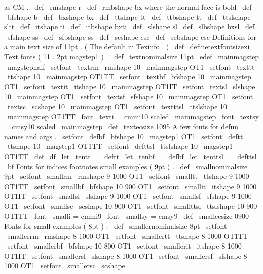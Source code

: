 {{as
CM
.
\
def
\
rmshape
{
r
}
\
def
\
rmbshape
{
bx
}
%
where
the
normal
face
is
bold
\
def
\
bfshape
{
b
}
\
def
\
bxshape
{
bx
}
\
def
\
ttshape
{
tt
}
\
def
\
ttbshape
{
tt
}
\
def
\
ttslshape
{
sltt
}
\
def
\
itshape
{
ti
}
\
def
\
itbshape
{
bxti
}
\
def
\
slshape
{
sl
}
\
def
\
slbshape
{
bxsl
}
\
def
\
sfshape
{
ss
}
\
def
\
sfbshape
{
ss
}
\
def
\
scshape
{
csc
}
\
def
\
scbshape
{
csc
}
%
Definitions
for
a
main
text
size
of
11pt
.
(
The
default
in
Texinfo
.
)
%
\
def
\
definetextfontsizexi
{
%
%
Text
fonts
(
11
.
2pt
magstep1
)
.
\
def
\
textnominalsize
{
11pt
}
\
edef
\
mainmagstep
{
\
magstephalf
}
\
setfont
\
textrm
\
rmshape
{
10
}
{
\
mainmagstep
}
{
OT1
}
\
setfont
\
texttt
\
ttshape
{
10
}
{
\
mainmagstep
}
{
OT1TT
}
\
setfont
\
textbf
\
bfshape
{
10
}
{
\
mainmagstep
}
{
OT1
}
\
setfont
\
textit
\
itshape
{
10
}
{
\
mainmagstep
}
{
OT1IT
}
\
setfont
\
textsl
\
slshape
{
10
}
{
\
mainmagstep
}
{
OT1
}
\
setfont
\
textsf
\
sfshape
{
10
}
{
\
mainmagstep
}
{
OT1
}
\
setfont
\
textsc
\
scshape
{
10
}
{
\
mainmagstep
}
{
OT1
}
\
setfont
\
textttsl
\
ttslshape
{
10
}
{
\
mainmagstep
}
{
OT1TT
}
\
font
\
texti
=
cmmi10
scaled
\
mainmagstep
\
font
\
textsy
=
cmsy10
scaled
\
mainmagstep
\
def
\
textecsize
{
1095
}
%
A
few
fonts
for
defun
names
and
args
.
\
setfont
\
defbf
\
bfshape
{
10
}
{
\
magstep1
}
{
OT1
}
\
setfont
\
deftt
\
ttshape
{
10
}
{
\
magstep1
}
{
OT1TT
}
\
setfont
\
defttsl
\
ttslshape
{
10
}
{
\
magstep1
}
{
OT1TT
}
\
def
\
df
{
\
let
\
tentt
=
\
deftt
\
let
\
tenbf
=
\
defbf
\
let
\
tenttsl
=
\
defttsl
\
bf
}
%
Fonts
for
indices
footnotes
small
examples
(
9pt
)
.
\
def
\
smallnominalsize
{
9pt
}
\
setfont
\
smallrm
\
rmshape
{
9
}
{
1000
}
{
OT1
}
\
setfont
\
smalltt
\
ttshape
{
9
}
{
1000
}
{
OT1TT
}
\
setfont
\
smallbf
\
bfshape
{
10
}
{
900
}
{
OT1
}
\
setfont
\
smallit
\
itshape
{
9
}
{
1000
}
{
OT1IT
}
\
setfont
\
smallsl
\
slshape
{
9
}
{
1000
}
{
OT1
}
\
setfont
\
smallsf
\
sfshape
{
9
}
{
1000
}
{
OT1
}
\
setfont
\
smallsc
\
scshape
{
10
}
{
900
}
{
OT1
}
\
setfont
\
smallttsl
\
ttslshape
{
10
}
{
900
}
{
OT1TT
}
\
font
\
smalli
=
cmmi9
\
font
\
smallsy
=
cmsy9
\
def
\
smallecsize
{
0900
}
%
Fonts
for
small
examples
(
8pt
)
.
\
def
\
smallernominalsize
{
8pt
}
\
setfont
\
smallerrm
\
rmshape
{
8
}
{
1000
}
{
OT1
}
\
setfont
\
smallertt
\
ttshape
{
8
}
{
1000
}
{
OT1TT
}
\
setfont
\
smallerbf
\
bfshape
{
10
}
{
800
}
{
OT1
}
\
setfont
\
smallerit
\
itshape
{
8
}
{
1000
}
{
OT1IT
}
\
setfont
\
smallersl
\
slshape
{
8
}
{
1000
}
{
OT1
}
\
setfont
\
smallersf
\
sfshape
{
8
}
{
1000
}
{
OT1
}
\
setfont
\
smallersc
\
scshape
{
}}}}
